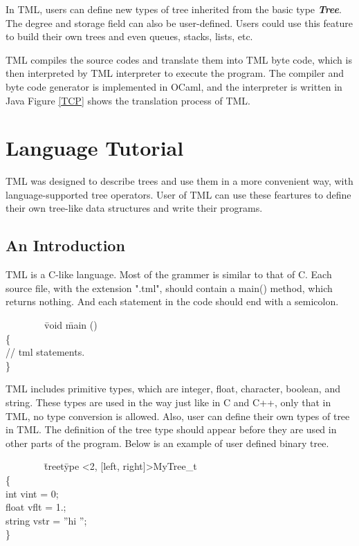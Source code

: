 \documentclass[12pt,psfig,a4]{article}
\begin{document}
In TML, users can define new types of tree inherited from the basic type \textbf{\emph{Tree}}. The degree and storage field can also be user-defined. Users could use this feature to build their own trees and even queues, stacks, lists, etc.

TML compiles the source codes and translate them into TML byte code, which is then interpreted by TML interpreter to execute the program. The compiler and byte code generator is implemented in OCaml, and the interpreter is written in Java Figure \ref{TCP} shows the translation process of TML.

\pagebreak
\section{Language Tutorial}
TML was designed to describe trees and use them in a more convenient way, with language-supported tree operators. User of TML can use these feartures to define their own tree-like data structures and write their programs.

\subsection{An Introduction}
TML is a C-like language. Most of the grammer is similar to that of C. Each source file, with the extension ".tml", should contain a main() method, which returns nothing. And each statement in the code should end with a semicolon.

\begin{code}
\begin{tabbing}
~~~~~~~~\= void \=main () \\
\> \{ \\
\> \> // tml statements.\\
\> \}
\end{tabbing}
\end{code}

TML includes primitive types, which are integer, float, character, boolean, and string. These types are used in the way just like in C and C++, only that in TML, no type conversion is allowed. Also, user can define their own types of tree in TML. The definition of the tree type should appear before they are used in other parts of the program. Below is an example of user defined binary tree.

\begin{code}
\begin{tabbing}
~~~~~~~~\= treet\=ype \textless2, [left, right]\textgreater MyTree\_t \\
\> \{ \\
\> \>int vint = 0;\\
\> \>float vflt = 1.;\\
\> \>string vstr = ''hi '';\\
\> \}
\end{tabbing}
\end{code}
\end{document}
